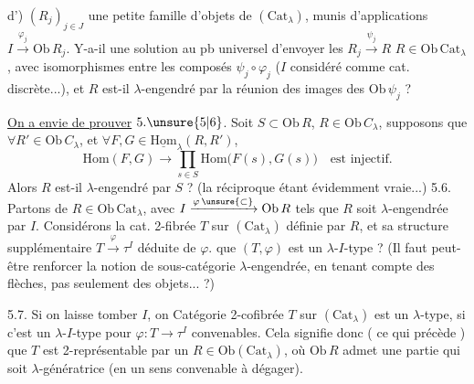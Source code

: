 d')  $(R_j)_{j\in J}$ une petite famille d'objets
de $(\mathrm{Cat}_\lambda)$, munis d'applications $I\xrightarrow{\varphi_j}\mathrm{Ob}\,R_j$. Y-a-il
une solution au pb universel d'envoyer les $R_j\xrightarrow{\psi_j}R$
$R\in\mathrm{Ob}\,\mathrm{Cat}_\lambda$, avec   isomorphismes entre
les composés  $\psi_j\circ\varphi_j$ ($I$ considéré comme
cat. discrète...), et $R$ est-il $\lambda$-engendré par la
réunion des images des $\mathrm{Ob}\,\psi_j$ ?

\uline{On a envie de prouver} $5.\unsure{5|6}$. Soit $S\subset\mathrm{Ob}\,R$, $R\in\mathrm{Ob}\,C_\lambda$,
supposons que $\forall R'\in\mathrm{Ob}\,C_\lambda$, et $\forall F,G\in\underline{\mathrm{Hom}}_\lambda(R,R')$,
\[
\mathrm{Hom}(F,G)\longrightarrow\prod_{s\in S}\mathrm{Hom}\bigl(F(s),G(s)\bigr)\quad\text{est injectif.}
\]
Alors $R$ est-il $\lambda$-engendré par $S$ ? (la réciproque
étant évidemment vraie...)
5.6. Partons de $R\in\mathrm{Ob}\,\mathrm{Cat}_{\lambda}$, avec $I\xrightarrow{\varphi\,\unsure{\subset}} \mathrm{Ob}\,R$ tels
que $R$ soit $\lambda$-engendrée par $I$. Considérons la cat.
2-fibrée $T$ sur $(\mathrm{Cat}_{\lambda})$ définie par $R$, et sa structure
supplémentaire $T\xrightarrow{\varphi}\tau^I$ déduite de $\varphi$. 
que $(T,\varphi)$ est un $\lambda$-$I$-type ? (Il faut peut-être
\margin{$|\!|\!|$}renforcer la notion de sous-catégorie $\lambda$-engendrée, en
tenant compte des flèches, pas seulement des objets... ?)

5.7. Si on laisse tomber $I$, on 
Catégorie 2-cofibrée $T$ sur $(\mathrm{Cat}_{\lambda})$ est un $\lambda$-type, si c'est
un $\lambda$-$I$-type pour  $\varphi:T\longrightarrow\tau^I$ convenables. Cela
signifie donc ( ce qui précède ) que
$T$ est 2-représentable par un $R\in\mathrm{Ob}(\mathrm{Cat}_{\lambda})$, où
$\mathrm{Ob}\,R$ admet une  partie qui soit $\lambda$-génératrice
(en un sens convenable à dégager).


